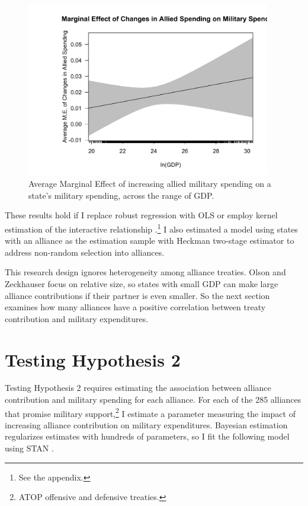 \documentclass[12pt]{article}
\begin{document}
\begin{figure}
	\centering
		\includegraphics[width=0.95\textwidth]{abs-margins-plot.pdf}
	\caption{Average Marginal Effect of increasing allied military spending on a state's military spending, across the range of GDP.}
		\label{fig:abs-margins-plot}
\end{figure}


These results hold if I replace robust regression with OLS or employ kernel estimation of the interactive relationship \citep{Hainmuelleretal2019}.\footnote{See the appendix.} 
I also estimated a model using states with an alliance as the estimation sample with Heckman two-stage estimator to address non-random selection into alliances. 


This research design ignores heterogeneity among alliance treaties.
Olson and Zeckhauser focus on relative size, so states with small GDP can make large alliance contributions if their partner is even smaller. 
So the next section examines how many alliances have a positive correlation between treaty contribution and military expenditures. 


\section{Testing Hypothesis 2}


Testing Hypothesis 2 requires estimating the association between alliance contribution and military spending for each alliance.
For each of the 285 alliances that promise military support,\footnote{ATOP offensive and defensive treaties.} I estimate a parameter measuring the impact of increasing alliance contribution on military expenditures. 
Bayesian estimation regularizes estimates with hundreds of parameters, so I fit the following model using STAN \citep{Carpenteretal2016}.
\end{document}

